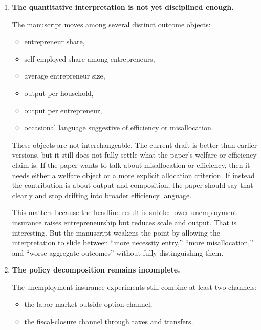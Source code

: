\documentclass[11pt]{article}
\begin{document}
\begin{enumerate}[leftmargin=*,label=\textbf{\arabic*.}]
For \textit{Econometrica}, I would want either a much tighter empirical
measurement argument, a clearer sufficient-statistics bridge, or a stronger
demonstration that the structural object delivers new disciplined implications
that are not already captured by reduced-form compositional margins.

\item \textbf{The quantitative interpretation is not yet disciplined enough.}

The manuscript moves among several distinct outcome objects:

\begin{itemize}[leftmargin=*]
\item entrepreneur share,
\item self-employed share among entrepreneurs,
\item average entrepreneur size,
\item output per household,
\item output per entrepreneur,
\item occasional language suggestive of efficiency or misallocation.
\end{itemize}

These objects are not interchangeable. The current draft is better than earlier
versions, but it still does not fully settle what the paper's welfare or
efficiency claim is. If the paper wants to talk about misallocation or
efficiency, then it needs either a welfare object or a more explicit allocation
criterion. If instead the contribution is about output and composition, the
paper should say that clearly and stop drifting into broader efficiency
language.

This matters because the headline result is subtle: lower unemployment insurance
raises entrepreneurship but reduces scale and output. That is interesting. But
the manuscript weakens the point by allowing the interpretation to slide between
``more necessity entry,'' ``more misallocation,'' and ``worse aggregate
outcomes'' without fully distinguishing them.

\item \textbf{The policy decomposition remains incomplete.}

The unemployment-insurance experiments still combine at least two channels:

\begin{itemize}[leftmargin=*]
\item the labor-market outside-option channel,
\item the fiscal-closure channel through taxes and transfers.
\end{itemize}


\end{enumerate}
\end{document}
